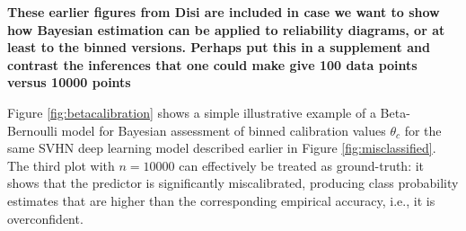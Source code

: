 \documentclass{article}
\begin{document}
{\bf These earlier figures from Disi are included in case we want to show how Bayesian estimation can be applied to reliability diagrams, or at least to the binned versions. Perhaps put this in a supplement and contrast the inferences that one could make give 100 data points versus 10000 points}
  

Figure \ref{fig:betacalibration} shows a simple illustrative example of a Beta-Bernoulli model for Bayesian assessment of binned calibration values $\theta_c$ for the same SVHN deep learning model described earlier in Figure \ref{fig:misclassified}.  
The third plot with $n=10000$ can effectively be treated as ground-truth: it shows that the predictor is significantly miscalibrated, producing class probability estimates that are higher than the corresponding empirical accuracy, i.e., it is overconfident.
\end{document}
